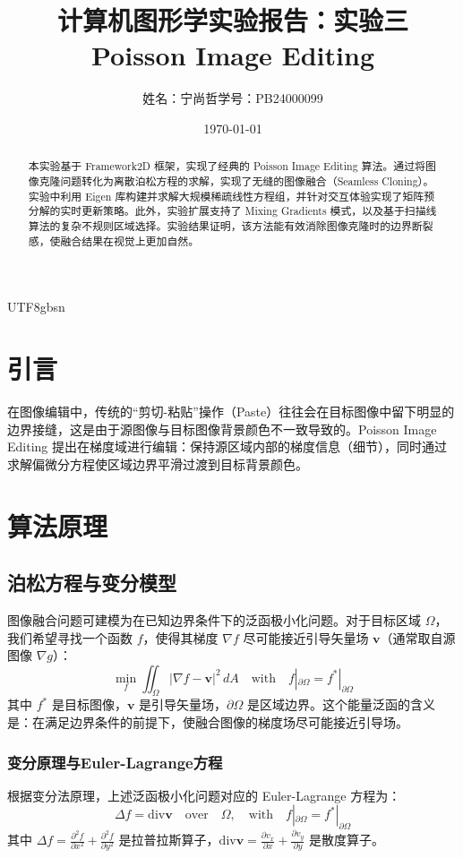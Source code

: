 \documentclass[11pt,a4paper]{article}
\title{计算机图形学实验报告：实验三 Poisson Image Editing}
\author{姓名：宁尚哲\quad 学号：PB24000099}
\date{\today}
\begin{document}
\begin{CJK*}{UTF8}{gbsn}

\maketitle

\begin{abstract}
    本实验基于 Framework2D 框架，实现了经典的 Poisson Image Editing 算法。通过将图像克隆问题转化为离散泊松方程的求解，实现了无缝的图像融合（Seamless Cloning）。实验中利用 Eigen 库构建并求解大规模稀疏线性方程组，并针对交互体验实现了矩阵预分解的实时更新策略。此外，实验扩展支持了 Mixing Gradients 模式，以及基于扫描线算法的复杂不规则区域选择。实验结果证明，该方法能有效消除图像克隆时的边界断裂感，使融合结果在视觉上更加自然。
\end{abstract}

\section{引言}
在图像编辑中，传统的“剪切-粘贴”操作（Paste）往往会在目标图像中留下明显的边界接缝，这是由于源图像与目标图像背景颜色不一致导致的。Poisson Image Editing 提出在梯度域进行编辑：保持源区域内部的梯度信息（细节），同时通过求解偏微分方程使区域边界平滑过渡到目标背景颜色。

\section{算法原理}
\subsection{泊松方程与变分模型}
图像融合问题可建模为在已知边界条件下的泛函极小化问题。对于目标区域 $\Omega$，我们希望寻找一个函数 $f$，使得其梯度 $\nabla f$ 尽可能接近引导矢量场 $\mathbf{v}$（通常取自源图像 $\nabla g$）：
\begin{equation}
    \min_f \iint_{\Omega} |\nabla f - \mathbf{v}|^2 \, dA \quad \text{with} \quad f|_{\partial \Omega} = f^*|_{\partial \Omega}
\end{equation}
其中 $f^*$ 是目标图像，$\mathbf{v}$ 是引导矢量场，$\partial \Omega$ 是区域边界。这个能量泛函的含义是：在满足边界条件的前提下，使融合图像的梯度场尽可能接近引导场。

\subsubsection{变分原理与Euler-Lagrange方程}
根据变分法原理，上述泛函极小化问题对应的 Euler-Lagrange 方程为：
\begin{equation}
    \Delta f = \text{div} \mathbf{v} \quad \text{over} \quad \Omega, \quad \text{with} \quad f|_{\partial \Omega} = f^*|_{\partial \Omega}
\end{equation}
其中 $\Delta f = \frac{\partial^2 f}{\partial x^2} + \frac{\partial^2 f}{\partial y^2}$ 是拉普拉斯算子，$\text{div} \mathbf{v} = \frac{\partial v_x}{\partial x} + \frac{\partial v_y}{\partial y}$ 是散度算子。


\end{CJK*}
\end{document}
